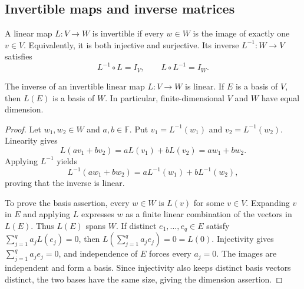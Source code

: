 


\subsection{Invertible maps and inverse matrices}

\begin{definition}
  A linear map \(L:V\to W\) is invertible if every \(w\in W\) is the
  image of exactly one \(v\in V\). Equivalently, it is both injective
  and surjective. Its inverse \(L^{-1}:W\to V\) satisfies
  \[
    L^{-1}\circ L=I_V,\qquad L\circ L^{-1}=I_W.
  \]
\end{definition}

\begin{pendingreview}
\begin{proposition}
  \label{thm:linear-algebra-i:inverse-linearity}
  The inverse of an invertible linear map \(L:V\to W\) is linear.
  If \(E\) is a basis of \(V\), then \(L(E)\) is a basis of \(W\).
  In particular, finite-dimensional \(V\) and \(W\) have equal dimension.
\end{proposition}

\begin{proof}
  Let \(w_1,w_2\in W\) and \(a,b\in\mathbb F\). Put
  \(v_1=L^{-1}(w_1)\) and \(v_2=L^{-1}(w_2)\). Linearity gives
  \[
    L(av_1+bv_2)=aL(v_1)+bL(v_2)=aw_1+bw_2.
  \]
  Applying \(L^{-1}\) yields
  \[
    L^{-1}(aw_1+bw_2)=aL^{-1}(w_1)+bL^{-1}(w_2),
  \]
  proving that the inverse is linear.

  To prove the basis assertion, every \(w\in W\) is \(L(v)\) for
  some \(v\in V\). Expanding \(v\) in \(E\) and applying \(L\)
  expresses \(w\) as a finite linear combination of the vectors in
  \(L(E)\). Thus \(L(E)\) spans \(W\).
  If distinct \(e_1,\ldots,e_q\in E\) satisfy
  \(\sum_{j=1}^q a_jL(e_j)=0\), then
  \(L(\sum_{j=1}^q a_je_j)=0=L(0)\). Injectivity gives
  \(\sum_{j=1}^q a_je_j=0\), and independence of \(E\) forces
  every \(a_j=0\). The images are independent and form a basis.
  Since injectivity also keeps distinct basis vectors distinct,
  the two bases have the same size, giving the dimension assertion.
\end{proof}
\end{pendingreview}

